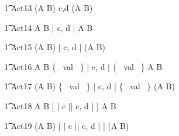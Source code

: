 \begin{circusaction}
        \t1 Act13 \circdef (A \circtimeout {} \rcirctime B) \linter c,d \rinter (A \circtimeout {} \rcirctime B) \\
\end{circusaction}

\begin{circusaction}
        \t1 Act14 \circdef A \circtimeout {} \rcirctime B \lpar | \lchanset c, d \rchanset | \rpar  A \circtimeout {} \rcirctime B \\
\end{circusaction}

\begin{circusaction}
        \t1 Act15 \circdef (A \circtimeout {} \rcirctime B) \lpar | \lchanset c, d \rchanset | \rpar (A \circtimeout {} \rcirctime B) \\
\end{circusaction}
        
\begin{circusaction}
        \t1 Act16 \circdef A \circtimeout {} \rcirctime B \lpar \{~ val ~\} | \lchanset c, d \rchanset | \{~ val ~\} \rpar A \circtimeout {} \rcirctime B \\
\end{circusaction}

\begin{circusaction}
        \t1 Act17 \circdef (A \circtimeout {} \rcirctime B) \lpar \{~ val ~\} | \lchanset c, d \rchanset | \{~ val ~\} \rpar (A \circtimeout {} \rcirctime B) \\
\end{circusaction}
   
\begin{circusaction}
        \t1 Act18 \circdef A \circtimeout {} \rcirctime B [ | \lchanset c \rchanset || \lchanset c, d \rchanset | ] A \circtimeout {} \rcirctime B \\
\end{circusaction}

\begin{circusaction}
        \t1 Act19 \circdef (A \circtimeout {} \rcirctime B) [ | \lchanset c \rchanset || \lchanset c, d \rchanset | ] (A \circtimeout {} \rcirctime B) \\
\end{circusaction}

